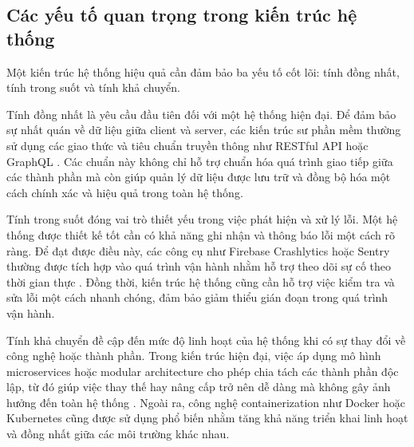     \subsection{Các yếu tố quan trọng trong kiến trúc hệ thống}
    \renewcommand{\labelitemi}{--}
    \begin{flushleft}
        \hspace*{0.8cm}Một kiến trúc hệ thống hiệu quả cần đảm bảo ba yếu tố cốt lõi: tính đồng nhất, tính trong suốt và tính khả chuyển.
    \end{flushleft}

    \begin{flushleft}
        \hspace*{0.8cm}Tính đồng nhất là yêu cầu đầu tiên đối với một hệ thống hiện đại. Để đảm bảo sự nhất quán về dữ liệu giữa client và server, các kiến trúc sư phần mềm thường sử dụng các giao thức và tiêu chuẩn truyền thông như RESTful API hoặc GraphQL \cite{restgraphql}. Các chuẩn này không chỉ hỗ trợ chuẩn hóa quá trình giao tiếp giữa các thành phần mà còn giúp quản lý dữ liệu được lưu trữ và đồng bộ hóa một cách chính xác và hiệu quả trong toàn hệ thống.
      \end{flushleft}

      \begin{flushleft}
        \hspace*{0.8cm}Tính trong suốt đóng vai trò thiết yếu trong việc phát hiện và xử lý lỗi. Một hệ thống được thiết kế tốt cần có khả năng ghi nhận và thông báo lỗi một cách rõ ràng. Để đạt được điều này, các công cụ như Firebase Crashlytics hoặc Sentry thường được tích hợp vào quá trình vận hành nhằm hỗ trợ theo dõi sự cố theo thời gian thực \cite{firebasecrashlytics}. Đồng thời, kiến trúc hệ thống cũng cần hỗ trợ việc kiểm tra và sửa lỗi một cách nhanh chóng, đảm bảo giảm thiểu gián đoạn trong quá trình vận hành.
      \end{flushleft}

      \begin{flushleft}
        \hspace*{0.8cm}Tính khả chuyển đề cập đến mức độ linh hoạt của hệ thống khi có sự thay đổi về công nghệ hoặc thành phần. Trong kiến trúc hiện đại, việc áp dụng mô hình microservices hoặc modular architecture cho phép chia tách các thành phần độc lập, từ đó giúp việc thay thế hay nâng cấp trở nên dễ dàng mà không gây ảnh hưởng đến toàn hệ thống \cite{microservices}. Ngoài ra, công nghệ containerization như Docker hoặc Kubernetes cũng được sử dụng phổ biến nhằm tăng khả năng triển khai linh hoạt và đồng nhất giữa các môi trường khác nhau.
      \end{flushleft}


